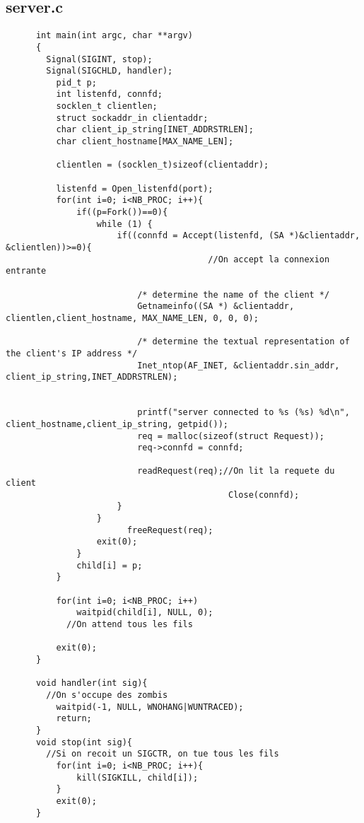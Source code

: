 \documentclass{report}
\begin{document}
      \subsection{server.c}
      \begin{lstlisting}
      int main(int argc, char **argv)
      {
      	Signal(SIGINT, stop);
      	Signal(SIGCHLD, handler);
          pid_t p;
          int listenfd, connfd;
          socklen_t clientlen;
          struct sockaddr_in clientaddr;
          char client_ip_string[INET_ADDRSTRLEN];
          char client_hostname[MAX_NAME_LEN];

          clientlen = (socklen_t)sizeof(clientaddr);

          listenfd = Open_listenfd(port);
          for(int i=0; i<NB_PROC; i++){
              if((p=Fork())==0){
                  while (1) {
                      if((connfd = Accept(listenfd, (SA *)&clientaddr, &clientlen))>=0){
      									//On accept la connexion entrante

                          /* determine the name of the client */
                          Getnameinfo((SA *) &clientaddr, clientlen,client_hostname, MAX_NAME_LEN, 0, 0, 0);

                          /* determine the textual representation of the client's IP address */
                          Inet_ntop(AF_INET, &clientaddr.sin_addr, client_ip_string,INET_ADDRSTRLEN);


                          printf("server connected to %s (%s) %d\n", client_hostname,client_ip_string, getpid());
                          req = malloc(sizeof(struct Request));
                          req->connfd = connfd;

                          readRequest(req);//On lit la requete du client
      										Close(connfd);
                      }
                  }
          				freeRequest(req);
                  exit(0);
              }
              child[i] = p;
          }

          for(int i=0; i<NB_PROC; i++)
              waitpid(child[i], NULL, 0);
      		//On attend tous les fils

          exit(0);
      }

      void handler(int sig){
      	//On s'occupe des zombis
          waitpid(-1, NULL, WNOHANG|WUNTRACED);
          return;
      }
      void stop(int sig){
      	//Si on recoit un SIGCTR, on tue tous les fils
          for(int i=0; i<NB_PROC; i++){
              kill(SIGKILL, child[i]);
          }
          exit(0);
      }


\end{lstlisting}
\end{document}
